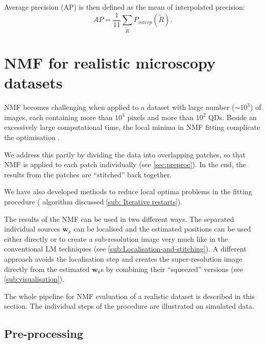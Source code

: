 Average precision (AP) is then defined as the mean of interpolated precision:
%
\begin{equation}
	AP=\frac{1}{11}\sum_{\tilde{R}}{P_{interp}(\tilde{R})}.
	\label{eq:AP}
\end{equation}


\clearpage
\section{NMF for realistic microscopy datasets \label{sec:NMF-for-real}}

NMF becomes challenging when applied to a dataset with large number ($\sim 10^3$) of images, each containing more than $10^4$ pixels and more than $10^2$ QDs. Beside an excessively large computational time, the local minima in NMF fitting complicate the optimisation \cite{Kim2008}. 

We address this partly by dividing the data into overlapping patches, so that NMF is applied to each patch individually (see \autoref{sec:preproc}).  In the end, the results from the patches are ``stitched'' back together. 

We have also developed methods to reduce local optima problems in the fitting procedure (\inmf{} algorithm discussed \autoref{sub: Iterative restarts}). 

The results of the NMF can be used in two different ways. The separated individual sources $\bm{w}_k$ can be localised and the estimated positions can be used either directly or to create a sub-resolution image very much like in the conventional LM techniques (see \autoref{sub:Localisation-and-stitching}). A different approach avoids the localisation step and creates the super-resolution image directly from the estimated $\bm{w}_k$s by combining their ``squeezed'' versions (see \autoref{sub:visualisation}). 

The whole pipeline for NMF evaluation of a realistic dataset is described in this section.  The individual steps of the procedure are illustrated on simulated data. 


\subsection{Pre-processing \label{sec:preproc}}


